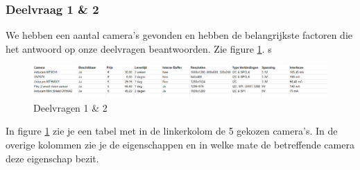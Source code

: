 \documentclass{article}
\begin{document}
\subsubsection{Deelvraag 1 {\&} 2}
We hebben een aantal camera's gevonden en hebben de belangrijkste factoren die het antwoord op onze deelvragen beantwoorden.
Zie figure \ref{fig:deelvragen1en2}.
s

\begin{figure}[h]
	\includegraphics[width=40em]{table2}
	\centering
	\caption{Deelvragen 1 {\&} 2}
	\label{fig:deelvragen1en2}
	\end{figure}

In figure \ref{fig:deelvragen1en2} zie je een tabel met in de linkerkolom de 5 gekozen camera's. In de overige kolommen zie je de eigenschappen en in welke mate de betreffende camera deze eigenschap bezit.
\end{document}
